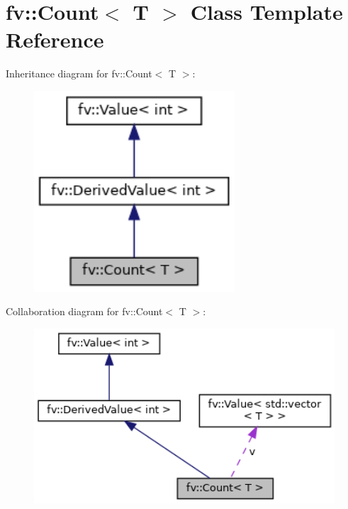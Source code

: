 \hypertarget{classfv_1_1Count}{}\section{fv\+:\+:Count$<$ T $>$ Class Template Reference}
\label{classfv_1_1Count}


Inheritance diagram for fv\+:\+:Count$<$ T $>$\+:
\nopagebreak
\begin{figure}[H]
\begin{center}
\leavevmode
\includegraphics[width=212pt]{classfv_1_1Count__inherit__graph}
\end{center}
\end{figure}


Collaboration diagram for fv\+:\+:Count$<$ T $>$\+:
\nopagebreak
\begin{figure}[H]
\begin{center}
\leavevmode
\includegraphics[width=350pt]{classfv_1_1Count__coll__graph}
\end{center}
\end{figure}
